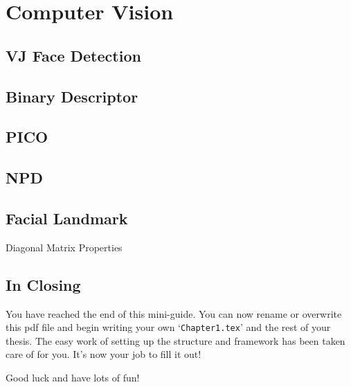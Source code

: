 \chapter{Computer Vision} %

\label{Chapter4} %


\section{VJ Face Detection}
\section{Binary Descriptor}
\section{PICO}
\section{NPD}
\section{Facial Landmark}
\begin{compactitem}

\item Diagonal Matrix Properties
\end{compactitem}


\section{In Closing}

You have reached the end of this mini-guide. You can now rename or overwrite this pdf file and begin writing your own `\texttt{Chapter1.tex}' and the rest of your thesis. The easy work of setting up the structure and framework has been taken care of for you. It's now your job to fill it out!

Good luck and have lots of fun!

